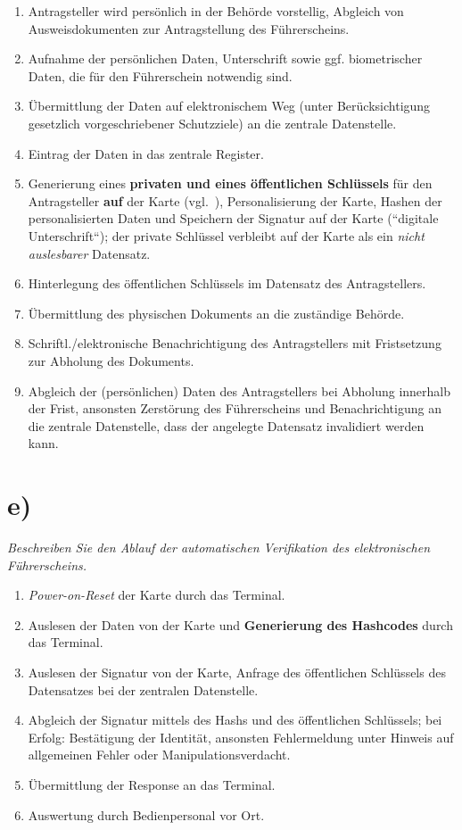 \begin{enumerate}
    \itemsep0.5em
    \item Antragsteller wird persönlich in der Behörde vorstellig, Abgleich von Ausweisdokumenten zur Antragstellung des Führerscheins.
    \item Aufnahme der persönlichen Daten, Unterschrift sowie ggf. biometrischer Daten, die für den Führerschein notwendig sind.
    \item Übermittlung der Daten auf elektronischem Weg (unter Berücksichtigung gesetzlich vorgeschriebener Schutzziele) an die zentrale Datenstelle.
    \item Eintrag der Daten in das zentrale Register.
    \item Generierung eines \textbf{privaten und eines öffentlichen Schlüssels} für den Antragsteller \textbf{auf} der Karte (vgl.~\cite[17 f.]{ITS5}), Personalisierung der Karte, Hashen der personalisierten Daten und Speichern der Signatur auf der Karte (``digitale Unterschrift``); der private Schlüssel verbleibt auf der Karte als ein \textit{nicht auslesbarer} Datensatz.
    \item Hinterlegung des öffentlichen Schlüssels im Datensatz des Antragstellers.
    \item Übermittlung des physischen Dokuments an die zuständige Behörde.
    \item Schriftl./elektronische Benachrichtigung des Antragstellers mit Fristsetzung zur Abholung des Dokuments.
    \item Abgleich der (persönlichen) Daten des Antragstellers bei Abholung innerhalb der Frist, ansonsten Zerstörung des Führerscheins und Benachrichtigung an die zentrale Datenstelle, dass der angelegte Datensatz invalidiert werden kann.
\end{enumerate}

\section{e)}

\textit{Beschreiben Sie den Ablauf der automatischen Verifikation des elektronischen Führerscheins.}

\begin{enumerate}
    \itemsep0.5em
    \item \textit{Power-on-Reset} der Karte durch das Terminal.
    \item Auslesen der Daten von der Karte und \textbf{Generierung des Hashcodes} durch das Terminal.
    \item Auslesen der Signatur von der Karte, Anfrage des öffentlichen Schlüssels des Datensatzes bei der zentralen Datenstelle.
    \item Abgleich der Signatur mittels des Hashs und des öffentlichen Schlüssels; bei Erfolg: Bestätigung der Identität, ansonsten Fehlermeldung unter Hinweis auf allgemeinen Fehler oder Manipulationsverdacht.
    \item Übermittlung der Response an das Terminal.
    \item Auswertung durch Bedienpersonal vor Ort.
\end{enumerate}
